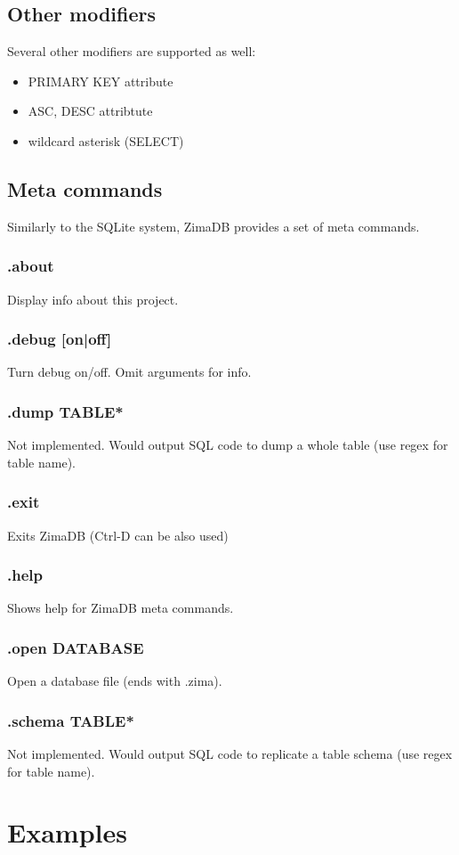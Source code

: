 \documentclass[a4paper]{article}
\begin{document}
\subsection{Other modifiers}
Several other modifiers are supported as well:
\begin{itemize}
    \item PRIMARY KEY attribute
    \item ASC, DESC attribtute
    \item wildcard asterisk (SELECT)
\end{itemize}

\subsection{Meta commands}
Similarly to the SQLite system, ZimaDB provides a set of meta commands.
\subsubsection{.about}
Display info about this project.
\subsubsection{.debug [on|off]}
Turn debug on/off. Omit arguments for info.
\subsubsection{.dump TABLE*}
Not implemented. Would output SQL code to dump a whole table (use regex for table name).
\subsubsection{.exit}
Exits ZimaDB (Ctrl-D can be also used)
\subsubsection{.help}
Shows help for ZimaDB meta commands.
\subsubsection{.open DATABASE}
Open a database file (ends with .zima).
\subsubsection{.schema TABLE*}
Not implemented. Would output SQL code to replicate a table schema (use regex for table name).

\section{Examples}
\end{document}

